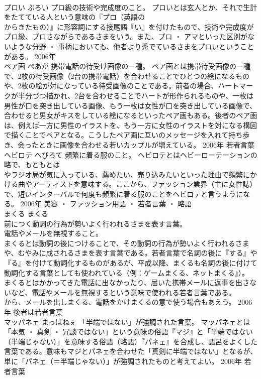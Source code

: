 \documentclass[8pt]{extreport}
\begin{document}
\begin{CJK}{UTF8}{min}
\\	プロい	ぷろい	プロ級の技術や完成度のこと。	プロいとは玄人とか、それで生計をたてている人という意味の『プロ（英語の
\\	からきたもの）』に形容詞にする接尾語『い』を付けたもので、技術や完成度がプロ級、プロさながらであるさまをいう。また、プロ ・ アマといった区別がないような分野 ・ 事柄においても、他者より秀でているさまをプロいということがある。	2006年	
\\	ペア画	ぺあが	携帯電話の待受け画像の一種。	ペア画とは携帯待受画像の一種で、2枚の待受画像（2台の携帯電話）を合わせることでひとつの絵になるものや、2枚の絵が対になっている待受画像のことである。前者の場合、ハートマークが半分づつ描かれ、2台を合わせることでハートが形作られるものや、一枚は男性が口を突き出している画像、もう一枚は女性が口を突き出している画像で、合わせると男女がキスをしている絵になるといったペア画もある。後者のペア画は、例えば一方に男性のイラストを、もう一方に女性のイラストを対になる構図で描くことでペアとなる。こうしたペア画に互いのメッセージを入れて持ち歩き、会ったときに画像を合わせる若いカップルが増えている。	2006年	若者言葉	
\\	ヘビロテ	へびろて	頻繁に着る服のこと。	ヘビロテとはヘビーローテーションの略で、もともとは
\\	やラジオ局が気に入っている、薦めたい、売り込みたいといった理由で頻繁にかける曲やアーティストを意味する。ここから、ファッション業界（主に女性誌）で、短いインターバルで何度も頻繁に着る服のことをヘビロテと言うようになる。	2006年	美容 ・ ファッション用語 ・ 若者言葉 ・ 略語	
\\	まくる	まくる	
\\	前につく動詞の行為が勢いよく行われるさまを表す言葉。 
\\	電話やメールを無視すること。	
\\	まくるとは動詞の後につけることで、その動詞の行為が勢いよく行われるさまや、むやみに成されるさまを表す言葉である。若者言葉で名詞の後に『する』や『る』を付けて動詞化するものがあるが、平成以降、まくるも名詞の後に付けて動詞化する言葉としても使われている（例：ゲームまくる、ネットまくる』）。 
\\	まくるとはかかってきた電話に出なかったり、届いた携帯メールに返事を出さないなど、電話やメールを無視するという意味で使われる若者言葉である。 
\\	から、メールを出しまくる、電話をかけまくるの意で使う場合もあえう。	2006年	後者は若者言葉	
\\	マッパネェ	まっぱねぇ	「半端ではない」が強調された言葉。	マッパネェとは「本気 ・ 真剣 ・ 冗談ではない」という意味の俗語『マジ』と「半端ではない（半端じゃない）」を意味する俗語（略語）『パネェ』を合成し、語呂をよくした言葉である。意味もマジとパネェを合わせた「真剣に半端ではない」となるが、単に「パネェ（＝半端じゃない）」が強調されたものと考えてよい。	2006年	若者言葉	

\end{CJK}
\end{document}
